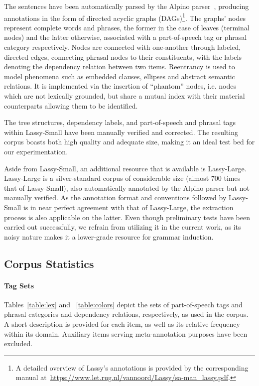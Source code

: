 The sentences have been automatically parsed by the Alpino parser~\cite{bouma2001alpino}, producing annotations in the form of directed acyclic graphs (DAGs)\footnote{A detailed overview of Lassy's annotations is provided by the corresponding manual at~\url{https://www.let.rug.nl/vannoord/Lassy/sa-man_lassy.pdf}.}.
The graphs' nodes represent complete words and phrases, the former in the case of leaves (terminal nodes) and the latter otherwise, associated with a part-of-speech tag or phrasal category respectively.
Nodes are connected with one-another through labeled, directed edges, connecting phrasal nodes to their constituents, with the labels denoting the dependency relation between two items. 
Reentrancy is used to model phenomena such as embedded clauses, ellipses and abstract semantic relations.
It is implemented via the insertion of ``phantom'' nodes, i.e. nodes which are not lexically grounded, but share a mutual index with their material counterparts allowing them to be identified.

The tree structures, dependency labels, and part-of-speech and phrasal tags within Lassy-Small have been manually verified and corrected.
The resulting corpus boasts both high quality and adequate size, making it an ideal test bed for our experimentation.

Aside from Lassy-Small, an additional resource that is available is Lassy-Large.
Lassy-Large is a silver-standard corpus of considerable size (almost 700 times that of Lassy-Small), also automatically annotated by the Alpino parser but not manually verified.
As the annotation format and conventions followed by Lassy-Small is in near perfect agreement with that of Lassy-Large, the extraction process is also applicable on the latter.
Even though preliminary tests have been carried out successfully, we refrain from utilizing it in the current work, as its noisy nature makes it a lower-grade resource for grammar induction.


\subsection{Corpus Statistics}
\paragraph{Tag Sets}
Tables~\ref{table:lex} and~
\ref{table:colors} depict the sets of part-of-speech tags and phrasal categories and dependency relations, respectively, as used in the corpus.
A short description is provided for each item, as well as its relative frequency within its domain.
Auxiliary items serving meta-annotation purposes have been excluded.

